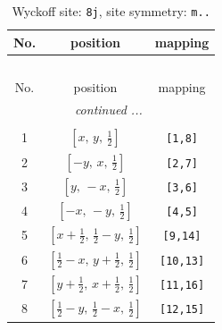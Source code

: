 \documentclass[fleqn,8pt]{jsarticle}
\begin{document}
\begin{longtable}{ccc}
\caption{Wyckoff site: {\tt 8j}, site symmetry: {\tt m..}}
 \\
 \hline \hline
No. & position & mapping \\ \hline \endfirsthead

\multicolumn{2}{l}{\tablename\ \thetable{}} \\
 \hline \hline
No. & position & mapping \\ \hline \endhead

 \hline \hline
\multicolumn{2}{r}{\footnotesize\it continued ...} \\ \endfoot

 \hline \hline
\multicolumn{2}{r}{} \\ \endlastfoot

1 & $\left[ x,\, y,\, \frac{1}{2} \right]$ & {\tt [1,8]} \\ \hline
2 & $\left[ - y,\, x,\, \frac{1}{2} \right]$ & {\tt [2,7]} \\ \hline
3 & $\left[ y,\, - x,\, \frac{1}{2} \right]$ & {\tt [3,6]} \\ \hline
4 & $\left[ - x,\, - y,\, \frac{1}{2} \right]$ & {\tt [4,5]} \\ \hline
5 & $\left[ x + \frac{1}{2},\, \frac{1}{2} - y,\, \frac{1}{2} \right]$ & {\tt [9,14]} \\ \hline
6 & $\left[ \frac{1}{2} - x,\, y + \frac{1}{2},\, \frac{1}{2} \right]$ & {\tt [10,13]} \\ \hline
7 & $\left[ y + \frac{1}{2},\, x + \frac{1}{2},\, \frac{1}{2} \right]$ & {\tt [11,16]} \\ \hline
8 & $\left[ \frac{1}{2} - y,\, \frac{1}{2} - x,\, \frac{1}{2} \right]$ & {\tt [12,15]} \\
\end{longtable}
\renewcommand{\arraystretch}{1.2}
\end{document}
